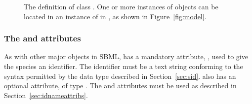 \begin{figure}[htb]
  \centering
  \small
  \caption{The definition of class \Species.  One or more
    instances of \Species objects can be located in an instance of
    \ListOfSpecies in \Model, as shown in
    Figure~\protect\ref{fig:model}.}
  \label{fig:species}
\end{figure}


\subsubsection{The  and  attributes}

As with other major objects in SBML, \Species has a mandatory
attribute, , used to give the species an identifier.  The
identifier must be a text string conforming to the syntax
permitted by the  data type described in
Section~\ref{sec:sid}.  \Species also has an optional 
attribute, of type .  The  and 
attributes must be used as described in
Section~\ref{sec:idnameattribs}.


